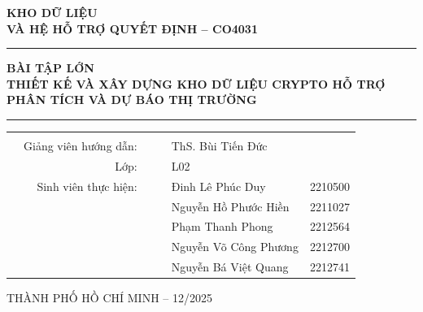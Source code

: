 \begin{titlepage}
\vspace{0.2cm}


\begin{center}

\textbf{{\LARGE KHO DỮ LIỆU \\ VÀ HỆ HỖ TRỢ QUYẾT ĐỊNH -- CO4031}}\\[0.5cm]


\hrule

\vspace{1cm}


\textbf{{\LARGE BÀI TẬP LỚN}} \\[0.5cm]
\textbf{{\huge THIẾT KẾ VÀ XÂY DỰNG KHO DỮ LIỆU CRYPTO HỖ TRỢ PHÂN TÍCH VÀ DỰ BÁO THỊ TRƯỜNG}}\\[0.5cm]

\hrule

\vspace{1cm}


\begin{table}[h]
\large
    \begin{tabular}{rrrrlr}
        \hspace{2.5 cm} &  &\\
        
        & Giảng viên hướng dẫn:&& & ThS. Bùi Tiến Đức & \\[0.25cm]
        & Lớp: &&& L02 & \\[0.25cm]
        & Sinh viên thực hiện: &&& Đinh Lê Phúc Duy & 2210500 \\
        &                      &&& Nguyễn Hồ Phước Hiền & 2211027 \\
        &                      &&& Phạm Thanh Phong & 2212564 \\
        &                      &&& Nguyễn Võ Công Phương & 2212700  \\
        &                      &&& Nguyễn Bá Việt Quang & 2212741 \\

    \end{tabular}
\end{table}


\end{center}


\vspace{1cm}
\centerline{\large THÀNH PHỐ HỒ CHÍ MINH -- 12/2025}

\end{titlepage}

\restoregeometry
